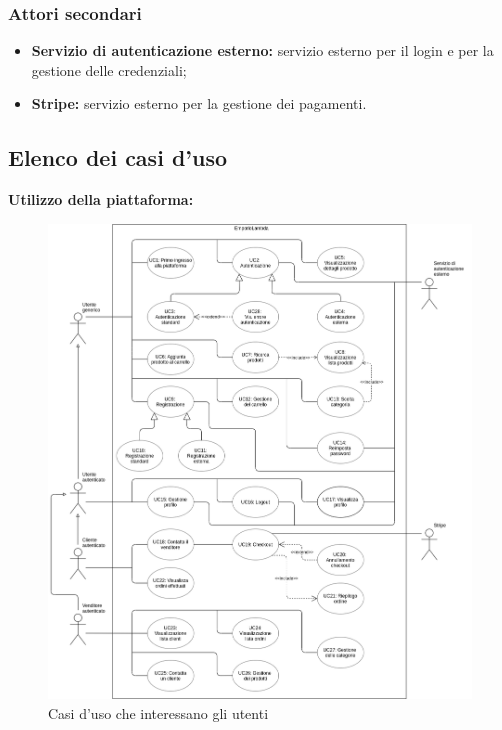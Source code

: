 \subsubsection{Attori secondari}
\begin{itemize}
    \item \textbf{Servizio di autenticazione esterno:} servizio esterno per il login e per la gestione delle credenziali;
    \item \textbf{Stripe:} servizio esterno per la gestione dei pagamenti.
\end{itemize}
\newpage
\subsection{Elenco dei casi d'uso}
\textbf{Utilizzo della piattaforma:}
\vspace{-10px}
\begin{figure}[!ht]
    \caption{Casi d'uso che interessano gli utenti}
    \vspace{10px}
    \includegraphics[scale=0.42]{../../../Images/AnalisiRequisiti/casiUso}
    \centering
\end{figure}
\newpage



